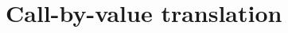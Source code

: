 \documentclass[runningheads]{llncs}
\makeatletter
\theoremstyle{definition}
\theoremstyle{plain}
\newcommand{\ie}{\textit{i.e.}}
\newcommand{\ih}{\textit{i.h.}}
\newcommand\smallbin[1]{\mathchoice
      {\mathbin{\raise.2ex \hbox{$\scriptstyle      #1$}}}%
      {\mathbin{\raise.2ex \hbox{$\scriptstyle      #1$}}}%
      {\mathbin{\raise.12ex\hbox{$\scriptscriptstyle#1$}}}%
      {\mathbin{           \hbox{$\scriptscriptstyle#1$}}}}%
\newcommand\Con{\wedge}
\newcommand\Imp{\rightarrow}
\newcommand\con{\kern1pt{\smallbin\Con}\kern1pt}
\newcommand\imp{\kern1pt{\smallbin\Imp}}
\newcommand\fl[1]{\mathsf{fl}(\trm{#1})}
\newcommand\black{\color{black}}
\newcommand\type@next[1]{%
  \ifx#1,\let\type@loop\type@end\else%
  \ifx#1_\let\type@loop\type@sub\else%
  \ifx#1^\let\type@loop\type@sup\else%
  \ifx#1*\con\else%
  \ifx#1-\kern1pt{\imp}\else%
  #1%
  \fi\fi\fi\fi\fi%
  \type@loop%
}
\newcommand\type@sup@color{}
\newcommand\type@sub[1]{_{#1}\let\type@loop\type@next\type@loop}
\newcommand\type@sup[1]{^{{\type@sup@color #1}}\let\type@loop\type@next\type@loop}
\newcommand\type@end{\let\type@sup@color\relax}
\newcommand\x{\lambda x}
\newcommand\y{\lambda y}
\newcommand\z{\lambda z}
\newcommand\+[1][{}]{\kern1pt{\smallbin\oplus}_{#1}\kern1pt}
\newcommand\lab{\bullet}
\newcommand\trm[1]{%
  \vphantom(%
  \let\term@loop=\term@next%
  \term@loop#1,%
}
\newcommand\term@next[1]{%
  \ifx#1,\let\term@loop\term@end\else%
  \ifx#1:\black\colon\term@typecolor\let\term@loop\term@type\else%
  \ifx#1_\let\term@loop\term@sub\else%
  \ifx#1^\let\term@loop\term@sup\else%
  \ifx#1!\let\term@loop\term@box\else%
  \ifx#1+\let\term@loop\term@prob\else%
  \ifx#1*^\lab\else%
  \ifx#1<\lfloor\else%
  \ifx#1>\rfloor\else%
  \ifx#1..\,\else%
  \ifx#1=\kern1pt{\smallbin=}\kern1pt\else
  #1%
  \fi\fi\fi\fi\fi\fi\fi\fi\fi\fi\fi%
  \term@loop%
}
\newcommand\term@typecolor{}
\newcommand\term@end{\let\term@typecolor\relax}
\newcommand\term@sub[1]{_{#1}\let\term@loop\term@next\term@loop}
\newcommand\term@sup[1]{^{#1}\let\term@loop\term@next\term@loop}
\newcommand\term@prob[1]{\kern1pt\raisebox{-.5pt}{$\overset{\raisebox{-1pt}{$\scriptstyle#1$}}{{\smallbin\oplus}}$}\kern1pt\let\term@loop\term@next\term@loop}
\newcommand\term@type{\let\type@loop=\type@next\type@loop}
\newcommand\term@box[1]{\probox{#1}\let\term@loop\term@next\term@loop}
\newcommand\probox[1]{\begin{tikzpicture}[baseline=0]\node[anchor=base](a){$\scriptstyle #1\vphantom)$};\draw[line width=.6pt] (-5pt,-2.5pt) rectangle (5pt,7.5pt);\end{tikzpicture}}
\newcommand\rw[1][{}]{\stackrel{#1}\rightsquigarrow}
\newcommand\perm{\mathsf p}
\newcommand\proj[3]{\pi^{#1}_{#2}(\trm{#3})}
\renewcommand\rw{\mathrel{\tikz\draw[rw](0,0)--(10pt,0pt);}}
\newcommand\rws{\mathrel{\tikz\draw[rws](0,0)--(10pt,0pt);}}
\makeatother
\begin{document}
%			
%		
%


\newcommand\val{\mathsf{v}}
\newcommand\plusval{\mathbin{\smallbin\oplus_\val}}

\section{Call-by-value translation}
\label{sec:cbv}
\end{document}
